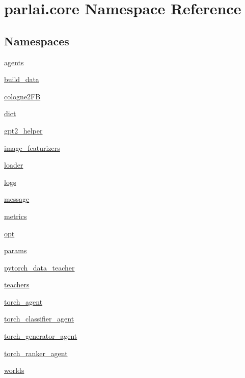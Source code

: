\hypertarget{namespaceparlai_1_1core}{}\section{parlai.\+core Namespace Reference}
\label{namespaceparlai_1_1core}
\subsection*{Namespaces}
\begin{DoxyCompactItemize}
\item 
 \hyperlink{namespaceparlai_1_1core_1_1agents}{agents}
\item 
 \hyperlink{namespaceparlai_1_1core_1_1build__data}{build\+\_\+data}
\item 
 \hyperlink{namespaceparlai_1_1core_1_1cologne2FB}{cologne2\+FB}
\item 
 \hyperlink{namespaceparlai_1_1core_1_1dict}{dict}
\item 
 \hyperlink{namespaceparlai_1_1core_1_1gpt2__helper}{gpt2\+\_\+helper}
\item 
 \hyperlink{namespaceparlai_1_1core_1_1image__featurizers}{image\+\_\+featurizers}
\item 
 \hyperlink{namespaceparlai_1_1core_1_1loader}{loader}
\item 
 \hyperlink{namespaceparlai_1_1core_1_1logs}{logs}
\item 
 \hyperlink{namespaceparlai_1_1core_1_1message}{message}
\item 
 \hyperlink{namespaceparlai_1_1core_1_1metrics}{metrics}
\item 
 \hyperlink{namespaceparlai_1_1core_1_1opt}{opt}
\item 
 \hyperlink{namespaceparlai_1_1core_1_1params}{params}
\item 
 \hyperlink{namespaceparlai_1_1core_1_1pytorch__data__teacher}{pytorch\+\_\+data\+\_\+teacher}
\item 
 \hyperlink{namespaceparlai_1_1core_1_1teachers}{teachers}
\item 
 \hyperlink{namespaceparlai_1_1core_1_1torch__agent}{torch\+\_\+agent}
\item 
 \hyperlink{namespaceparlai_1_1core_1_1torch__classifier__agent}{torch\+\_\+classifier\+\_\+agent}
\item 
 \hyperlink{namespaceparlai_1_1core_1_1torch__generator__agent}{torch\+\_\+generator\+\_\+agent}
\item 
 \hyperlink{namespaceparlai_1_1core_1_1torch__ranker__agent}{torch\+\_\+ranker\+\_\+agent}
\item 
 \hyperlink{namespaceparlai_1_1core_1_1worlds}{worlds}
\end{DoxyCompactItemize}
